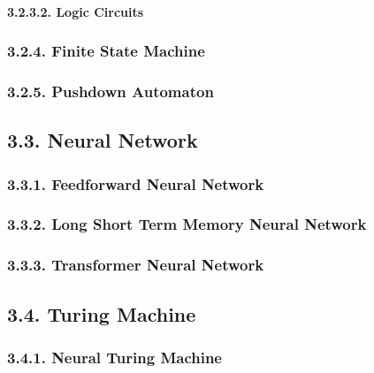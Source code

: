 \documentclass[
]{article}
\begin{document}
\hypertarget{logic-circuits-1}{%
\paragraph{3.2.3.2. Logic Circuits}\label{logic-circuits-1}}

\hypertarget{finite-state-machine-1}{%
\subsubsection{3.2.4. Finite State
Machine}\label{finite-state-machine-1}}

\hypertarget{pushdown-automaton-1}{%
\subsubsection{3.2.5. Pushdown Automaton}\label{pushdown-automaton-1}}

\hypertarget{neural-network-1}{%
\subsection{3.3. Neural Network}\label{neural-network-1}}

\hypertarget{feedforward-neural-network-1}{%
\subsubsection{3.3.1. Feedforward Neural
Network}\label{feedforward-neural-network-1}}

\hypertarget{long-short-term-memory-neural-network-1}{%
\subsubsection{3.3.2. Long Short Term Memory Neural
Network}\label{long-short-term-memory-neural-network-1}}

\hypertarget{transformer-neural-network-1}{%
\subsubsection{3.3.3. Transformer Neural
Network}\label{transformer-neural-network-1}}

\hypertarget{turing-machine-1}{%
\subsection{3.4. Turing Machine}\label{turing-machine-1}}

\hypertarget{neural-turing-machine-1}{%
\subsubsection{3.4.1. Neural Turing
Machine}\label{neural-turing-machine-1}}
\end{document}
